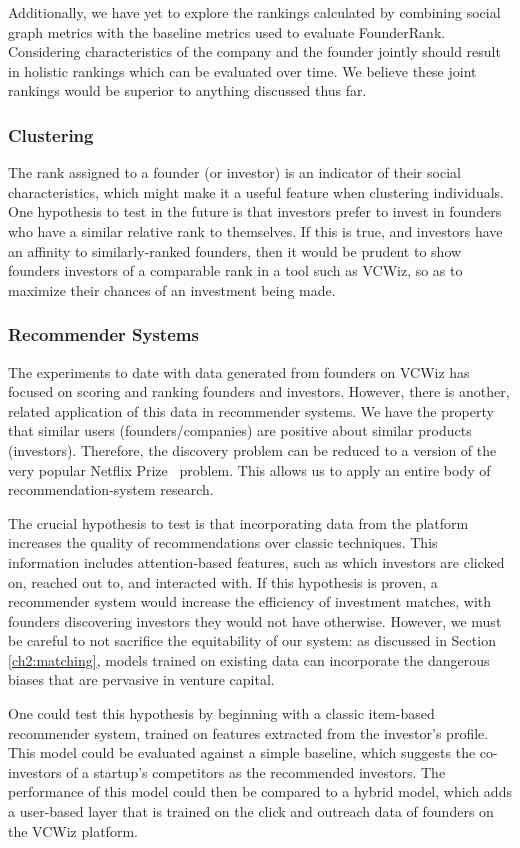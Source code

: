 Additionally, we have yet to explore the rankings calculated by combining social graph metrics with the baseline metrics used to evaluate FounderRank. Considering characteristics of the company and the founder jointly should result in holistic rankings which can be evaluated over time. We believe these joint rankings would be superior to anything discussed thus far.

\subsubsection{Clustering}

The rank assigned to a founder (or investor) is an indicator of their social characteristics, which might make it a useful feature when clustering individuals. One hypothesis to test in the future is that investors prefer to invest in founders who have a similar relative rank to themselves. If this is true, and investors have an affinity to similarly-ranked founders, then it would be prudent to show founders investors of a comparable rank in a tool such as VCWiz, so as to maximize their chances of an investment being made.

\subsubsection{Recommender Systems}

The experiments to date with data generated from founders on VCWiz has focused on scoring and ranking founders and investors. However, there is another, related application of this data in recommender systems. We have the property that similar users (founders/companies) are positive about similar products (investors). Therefore, the discovery problem can be reduced to a version of the very popular Netflix Prize~\cite{netflixpize} problem. This allows us to apply an entire body of recommendation-system research.

The crucial hypothesis to test is that incorporating data from the platform increases the quality of recommendations over classic techniques. This information includes attention-based features, such as which investors are clicked on, reached out to, and interacted with. If this hypothesis is proven, a recommender system would increase the efficiency of investment matches, with founders discovering investors they would not have otherwise. However, we must be careful to not sacrifice the equitability of our system: as discussed in Section \ref{ch2:matching}, models trained on existing data can incorporate the dangerous biases that are pervasive in venture capital.

One could test this hypothesis by beginning with a classic item-based recommender system, trained on features extracted from the investor's profile. This model could be evaluated against a simple baseline, which suggests the co-investors of a startup's competitors as the recommended investors. The performance of this model could then be compared to a hybrid model, which adds a user-based layer that is trained on the click and outreach data of founders on the VCWiz platform.
